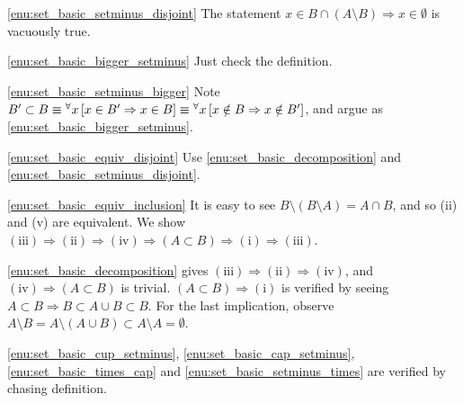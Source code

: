 \documentclass[a4paper,12pt]{article}
\begin{document}
\begin{prf}
	\ref{enu:set_basic_setminus_disjoint}
	The statement \(  x \in  B \cap (A \setminus B) \Rightarrow x \in \emptyset \)
	is vacuously true.
	
	\ref{enu:set_basic_bigger_setminus}
	Just check the definition.
	
	\ref{enu:set_basic_setminus_bigger}
	Note
	\( B' \subset B
	\equiv
	{}^{\forall}  x\left[ x \in B' \Rightarrow  x \in B\right]
	\equiv
	{}^{\forall}  x\left[ x \notin B \Rightarrow  x \notin B'\right]
	\),
	and argue as \ref{enu:set_basic_bigger_setminus}.
	
	\ref{enu:set_basic_equiv_disjoint}
	Use \ref{enu:set_basic_decomposition} and \ref{enu:set_basic_setminus_disjoint}.
	
	\ref{enu:set_basic_equiv_inclusion}
	It is easy to see
	\( B \setminus(B \setminus A) = A \cap B \),
	and so (ii) and (v) are equivalent.
	We show
	\( \mathrm{(iii)} \Rightarrow \mathrm{(ii)} \Rightarrow \mathrm{(iv)}
	\Rightarrow (A \subset B) \Rightarrow \mathrm{(i)} \Rightarrow \mathrm{(iii)}\).
	
	\ref{enu:set_basic_decomposition} gives \( \mathrm{(iii)} \Rightarrow \mathrm{(ii)} \Rightarrow \mathrm{(iv)} \),
	and \( \mathrm{(iv)}\Rightarrow (A \subset B) \) is trivial.
	\( (A \subset B) \Rightarrow \mathrm{(i)} \) is verified by seeing
	\( A \subset B \Rightarrow B \subset A\cup B \subset B\).
	For the last implication, observe
	\( A\setminus B = A \setminus (A\cup B) \subset A \setminus A = \emptyset\).
	
	\ref{enu:set_basic_cup_setminus},
	\ref{enu:set_basic_cap_setminus},
	\ref{enu:set_basic_times_cap}
	and \ref{enu:set_basic_setminus_times} are verified by chasing definition.
\end{prf}
\end{document}
